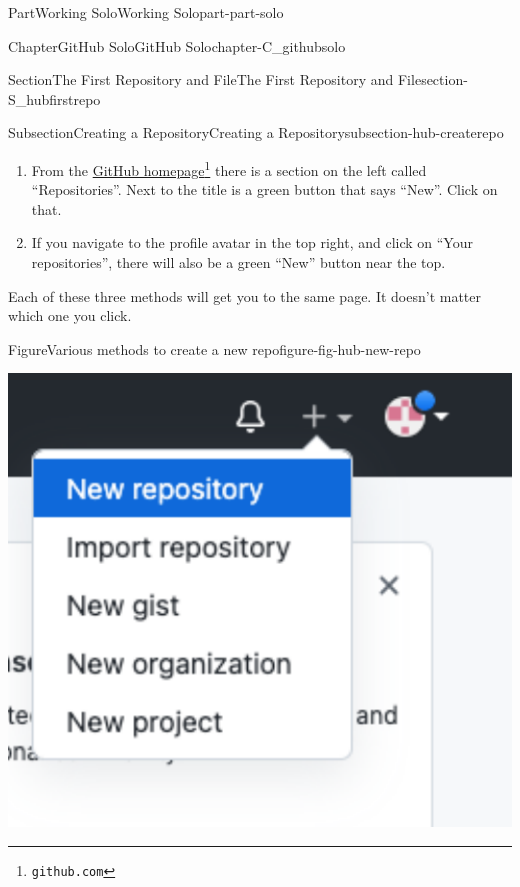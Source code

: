 \documentclass[oneside,10pt,]{book}
\begin{document}
\begin{partptx}{Part}{Working Solo}{}{Working Solo}{}{}{part-part-solo}
\begin{chapterptx}{Chapter}{GitHub Solo}{}{GitHub Solo}{}{}{chapter-C_githubsolo}
\begin{sectionptx}{Section}{The First Repository and File}{}{The First Repository and File}{}{}{section-S_hubfirstrepo}
\begin{subsectionptx}{Subsection}{Creating a Repository}{}{Creating a Repository}{}{}{subsection-hub-createrepo}
\begin{enumerate}
\par
Note: GitHub differentiates bewteen a repository and a project. Don't get confused. We want repository (and you will want that for most purposes).%
\item{}From the \href{https://github.com}{GitHub homepage}\footnote{\nolinkurl{github.com}\label{fn-hub-createrepo-c-b-b-a-b}} there is a section on the left called ``Repositories''. Next to the title is a green button that says ``New''. Click on that.%
\item{}If you navigate to the profile avatar in the top right, and click on ``Your repositories'', there will also be a green ``New'' button near the top.%
\end{enumerate}
Each of these three methods will get you to the same page. It doesn't matter which one you click.%
\begin{figureptx}{Figure}{Various methods to create a new repo}{figure-fig-hub-new-repo}{}%
\begin{sidebyside}{2}{0.025}{0.025}{0.05}%
\begin{sbspanel}{0.45}%
\includegraphics[width=\linewidth]{external/hub_new_repo_navbar.pdf}
\end{sbspanel}%
\begin{sbspanel}{0.45}%

\end{sbspanel}
\end{sidebyside}
\end{figureptx}
\end{subsectionptx}
\end{sectionptx}
\end{chapterptx}
\end{partptx}
\end{document}
